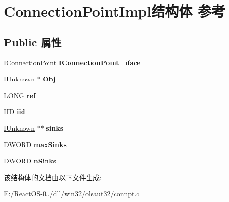 \hypertarget{struct_connection_point_impl}{}\section{Connection\+Point\+Impl结构体 参考}
\label{struct_connection_point_impl}
\subsection*{Public 属性}
\begin{DoxyCompactItemize}
\item 
\mbox{\label{struct_connection_point_impl_a95ee1813c3d7d60b80c252a17e58fea1}} 
\hyperlink{interface_i_connection_point}{I\+Connection\+Point} {\bfseries I\+Connection\+Point\+\_\+iface}
\item 
\mbox{\label{struct_connection_point_impl_a2cc86c82a9f15fe8c0d33fa52ed66e36}} 
\hyperlink{interface_i_unknown}{I\+Unknown} $\ast$ {\bfseries Obj}
\item 
\mbox{\label{struct_connection_point_impl_a11f5ad81cc339a860f1456def7252d64}} 
L\+O\+NG {\bfseries ref}
\item 
\mbox{\label{struct_connection_point_impl_a912815b9aec33b3f96000e22d0cd7d17}} 
\hyperlink{struct___i_i_d}{I\+ID} {\bfseries iid}
\item 
\mbox{\label{struct_connection_point_impl_a960bac0ac79a14b7ce0a85d4e8d780f3}} 
\hyperlink{interface_i_unknown}{I\+Unknown} $\ast$$\ast$ {\bfseries sinks}
\item 
\mbox{\label{struct_connection_point_impl_afef068b48d94be6d1055aac97b02f0b2}} 
D\+W\+O\+RD {\bfseries max\+Sinks}
\item 
\mbox{\label{struct_connection_point_impl_a41f45bdf34b501c57bab117be38a2499}} 
D\+W\+O\+RD {\bfseries n\+Sinks}
\end{DoxyCompactItemize}


该结构体的文档由以下文件生成\+:\begin{DoxyCompactItemize}
\item 
E\+:/\+React\+O\+S-\/0../dll/win32/oleaut32/connpt.\+c\end{DoxyCompactItemize}
